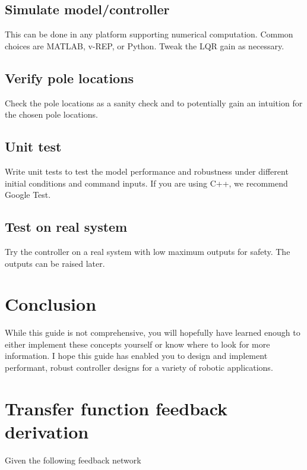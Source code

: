 \documentclass[10pt,conference,compsoc]{IEEEtran}
\begin{document}
\subsection{Simulate model/controller}

This can be done in any platform supporting numerical computation. Common
choices are MATLAB, v-REP, or Python. Tweak the LQR gain as necessary.

\subsection{Verify pole locations}

Check the pole locations as a sanity check and to potentially gain an intuition
for the chosen pole locations.

\subsection{Unit test}

Write unit tests to test the model performance and robustness under different
initial conditions and command inputs. If you are using C++, we recommend Google
Test.

\subsection{Test on real system}

Try the controller on a real \gls{system} with low maximum outputs for safety.
The outputs can be raised later.

\section{Conclusion}

While this guide is not comprehensive, you will hopefully have learned enough to
either implement these concepts yourself or know where to look for more
information. I hope this guide has enabled you to design and implement
performant, robust controller designs for a variety of robotic applications.

\appendices

\section{Transfer function feedback derivation}
\label{sec:app_tf_feedback_deriv}

Given the following feedback network
\end{document}
